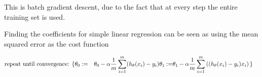 \documentclass[
]{article}
\begin{document}
This is batch gradient descent, due to the fact that at every step the
entire training set is used.

Finding the coefficients for simple linear regression can be seen as
using the mean squared error as the cost function

\begin{align*} \text{repeat until convergence: } \lbrace & \newline \theta_0 := & \theta_0 - \alpha \frac{1}{m} \sum\limits_{i=1}^{m}(h_\theta(x_{i}) - y_{i}) \newline \theta_1 := & \theta_1 - \alpha \frac{1}{m} \sum\limits_{i=1}^{m}\left((h_\theta(x_{i}) - y_{i}) x_{i}\right) \newline \rbrace& \end{align*}
\end{document}
